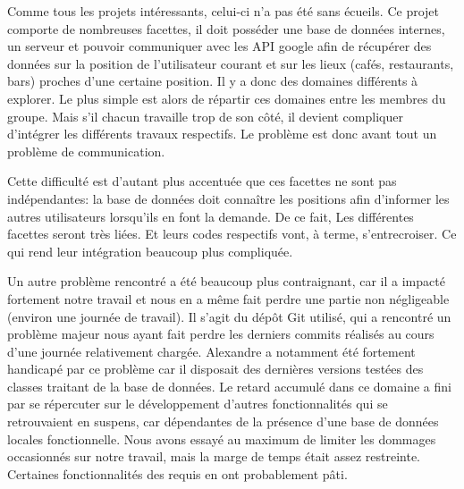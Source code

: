 Comme tous les projets intéressants, celui-ci n'a pas été sans écueils. Ce projet comporte de nombreuses facettes, il doit
posséder une base de données internes, un serveur et pouvoir communiquer avec les API google afin de récupérer des données sur la
position de l'utilisateur courant et sur les lieux (cafés, restaurants, bars) proches d'une certaine position. Il y a donc des
domaines différents à explorer. Le plus simple est alors de répartir ces domaines entre les membres du groupe. Mais s'il chacun
travaille trop de son côté, il devient compliquer d'intégrer les différents travaux respectifs. Le problème est donc avant tout un
problème de communication.
\newline

Cette difficulté est d'autant plus accentuée que ces facettes ne sont pas indépendantes: la base de données doit connaître les
positions afin d'informer les autres utilisateurs lorsqu'ils en font la demande. De ce fait, Les différentes facettes seront très
liées. Et leurs codes respectifs vont, à terme, s'entrecroiser. Ce qui rend leur intégration beaucoup plus compliquée.

\newline
Un autre problème rencontré a été beaucoup plus contraignant, car il a impacté fortement notre travail et nous en a même fait perdre une partie non négligeable (environ une journée de travail). Il s'agit du dépôt Git utilisé, qui a rencontré un problème majeur nous ayant fait perdre les derniers commits réalisés au cours d'une journée relativement chargée. Alexandre a notamment été fortement handicapé par ce problème car il disposait des dernières versions testées des classes traitant de la base de données. Le retard accumulé dans ce domaine a fini par se répercuter sur le développement d'autres fonctionnalités qui se retrouvaient en suspens, car dépendantes de la présence d'une base de données locales fonctionnelle. Nous avons essayé au maximum de limiter les dommages occasionnés sur notre travail, mais la marge de temps était assez restreinte. Certaines fonctionnalités des requis en ont probablement pâti. 